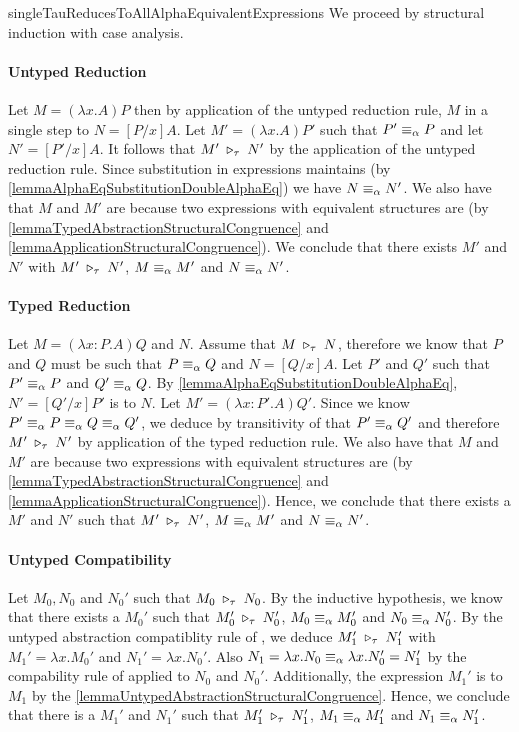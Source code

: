 %
%

\begin{longproof}{singleTauReducesToAllAlphaEquivalentExpressions}
We proceed by structural induction with case analysis.

\paragraph{Untyped Reduction}
Let $M=(\lambda x.A)P$ then by application of the untyped reduction rule, $M$ \taureduces in a single step to $N=[P/x]A$. Let $M'=(\lambda x.A)P'$ such that $P' \equiv_\alpha P$ and let $N'=[P'/x]A$. It follows that $M' \;\triangleright_\tau\; N'$ by the application of the untyped reduction rule. Since substitution in \alphaequivalent expressions maintains \alphaequivalence (by \cref{lemmaAlphaEqSubstitutionDoubleAlphaEq}) we have $N \equiv_\alpha N'$. We also have that $M$ and $M'$ are \alphaequivalent because two expressions with equivalent structures are \alphaequivalence (by \cref{lemmaTypedAbstractionStructuralCongruence} and \cref{lemmaApplicationStructuralCongruence}). We conclude that there exists $M'$ and $N'$ with $M' \;\triangleright_\tau\; N'$, $M \equiv_\alpha M'$ and $N \equiv_\alpha N'$.

\paragraph{Typed Reduction}
Let $M=(\lambda x:P.A)Q$ and $N$. Assume that $M \;\triangleright_\tau\; N$, therefore we know that $P$ and $Q$ must be such that $P \equiv_\alpha Q$ and $N=[Q/x]A$. Let $P'$ and $Q'$ such that $P' \equiv_\alpha P$ and $Q' \equiv_\alpha Q$. By \cref{lemmaAlphaEqSubstitutionDoubleAlphaEq}, $N'=[Q'/x]P'$ is \alphaequivalent to $N$. Let $M'=(\lambda x:P'.A)Q'$. Since we know $P' \equiv_\alpha P \equiv_\alpha Q \equiv_\alpha Q'$, we deduce by transitivity of \alphaequivalence that $P' \equiv_\alpha Q'$ and therefore $M' \;\triangleright_\tau\; N'$ by application of the typed reduction rule. We also have that $M$ and $M'$ are \alphaequivalent because two expressions with equivalent structures are \alphaequivalence (by \cref{lemmaTypedAbstractionStructuralCongruence} and \cref{lemmaApplicationStructuralCongruence}). Hence, we conclude that there exists a $M'$ and $N'$ such that $M' \;\triangleright_\tau\; N'$, $M \equiv_\alpha M'$ and $N \equiv_\alpha N'$.

\paragraph{Untyped Compatibility}
Let $M_0, N_0$ and $N_0'$ such that $M_0 \;\triangleright_\tau\; N_0$. By the inductive hypothesis, we know that there exists a $M_0'$ such that $M_0' \;\triangleright_\tau\; N_0'$, $M_0 \equiv_\alpha M_0'$ and $N_0 \equiv_\alpha N_0'$. By the untyped abstraction compatiblity rule of \taureduction, we deduce $M_1' \;\triangleright_\tau\; N_1'$ with $M_1'=\lambda x.M_0'$ and $N_1'=\lambda x.N_0'$. Also $N_1=\lambda x.N_0 \equiv_\alpha \lambda x.N_0'=N_1'$ by the compability rule of \alphaequivalence applied to $N_0$ and $N_0'$. Additionally, the expression $M_1'$ is \alphaequivalent to $M_1$ by the \cref{lemmaUntypedAbstractionStructuralCongruence}. Hence, we conclude that there is a $M_1'$ and $N_1'$ such that $M_1' \;\triangleright_\tau\; N_1'$, $M_1 \equiv_\alpha M_1'$ and $N_1 \equiv_\alpha N_1'$.


\end{longproof}
